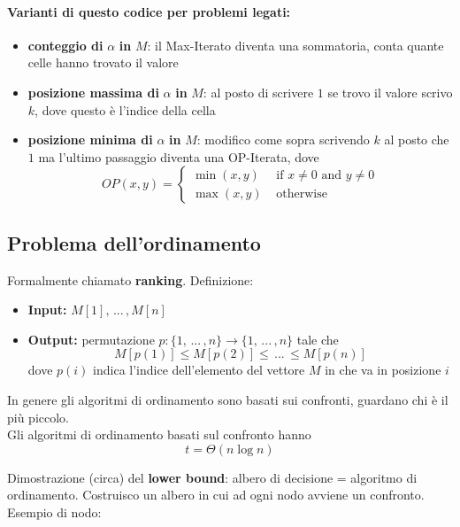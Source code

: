 \documentclass[11pt]{article}
\begin{document}
	\paragraph{Varianti di questo codice per problemi legati:}
	\begin{itemize}
		\item \textbf{conteggio di} $\alpha$ \textbf{in} $M$: il Max-Iterato diventa una sommatoria, conta quante celle hanno trovato il valore
		\item \textbf{posizione massima di} $\alpha$ \textbf{in} $M$: al posto di scrivere $1$ se trovo il valore scrivo $k$, dove questo è l'indice della cella 
		\item \textbf{posizione minima di} $\alpha$ \textbf{in} $M$: modifico come sopra scrivendo $k$ al posto che $1$ ma l'ultimo passaggio diventa una OP-Iterata, dove
		$$ OP (x,y) = \begin{cases}
			\min (x,y) & \text{ if } x \neq 0 \text{ and } y \neq 0 \\
			\max (x,y) & \text{ otherwise}
		\end{cases}$$
	\end{itemize}
	
	
	\newpage
	
	\subsection{Problema dell'ordinamento}
	
	Formalmente chiamato \textbf{ranking}. Definizione:
	\begin{itemize}
		\item \textbf{Input:} $M[1], \, ... \, , M[n]$
		
		\item \textbf{Output:} permutazione $p: \{1, \, ... \, , n\} \rightarrow \{1, \, ... \, , n\}$ tale che
		$$ M[p(1)] \leq M[p(2)] \leq \, ... \, \leq M[p(n)] $$
		dove $p(i)$ indica l'indice dell'elemento del vettore $M$ in che va in posizione $i$
	\end{itemize}
	
	In genere gli algoritmi di ordinamento sono basati sui confronti, guardano chi è il più piccolo.\\
	Gli algoritmi di ordinamento basati sul confronto hanno 
	$$ t = \Theta (n \log n) $$
	
	Dimostrazione (circa) del \textbf{lower bound}: albero di decisione = algoritmo di ordinamento. Costruisco un albero in cui ad ogni nodo avviene un confronto.\\
	Esempio di nodo: 
	\begin{center}
	\end{center}
	
\end{document}
